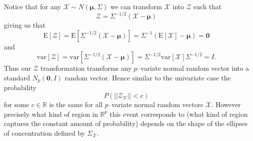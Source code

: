 \documentclass{book}
\newcommand{\bs}[1]{\boldsymbol{#1}}
\newcommand{\rv}[1]{\bs{\mathscr{#1}}}
\newcommand{\e}[1]{\text{E}\left[#1\right]}
\begin{document}
Notice that for any $\rv{X}\sim N(\bs{\mu},\Sigma)$ we can transform $\rv{X}$ into $\rv{Z}$ such that 
$$
\rv{Z}=\Sigma^{-1/2}(\rv{X}-\bs{\mu})
$$
giving us that
$$
\e{\rv{Z}}=\e{\Sigma^{-1/2}(\rv{X}-\bs{\mu})}=\Sigma^{-1}\left(\e{\rv{X}}-\bs{\mu}\right)=\bs{0}
$$
and
$$
\text{var}\left[\rv{Z}\right]=\text{var}\left[\Sigma^{-1/2}(\rv{X}-\bs{\mu})\right]=\Sigma^{-1/2}\text{var}\left[\rv{X}\right]\Sigma^{-1/2}=I.
$$
 Thus our $\rv{Z}$ transformation transforms any $p$--variate normal random vector into a standard $N_p(\bs{0},I)$ random vector. Hence similar to the univariate case the probability
$$
P(||\rv{Z}_{\rv{X}}||<c)
$$
for some $c \in\mathbb{R}$ is the same for all $p$--variate normal random vectors $\rv{X}$. However precisely what kind of region in $\mathbb{R}^p$ this event corresponds to (what kind of region captures the constant amount of probability) depends on the shape of the ellipses of concentration defined by $\Sigma_{\rv{X}}$. 
\end{document}
